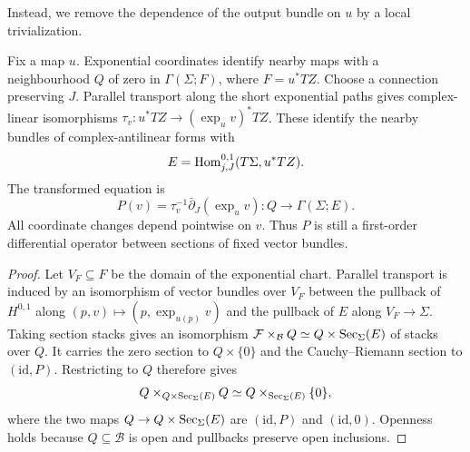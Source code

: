 Instead, we remove the dependence of the output bundle on $u$ by a local
trivialization.

Fix a map $u$. Exponential coordinates identify nearby maps with a
neighbourhood $Q$ of zero in $\Gamma(\Sigma;F)$, where $F=u^*TZ$.
Choose a connection preserving $J$. Parallel transport along the short
exponential paths gives complex-linear isomorphisms
$\tau_v\colon u^*TZ\to(\exp_u v)^*TZ$.
These identify the nearby bundles of complex-antilinear forms with
\[
 E=\operatorname{Hom}^{0,1}_{j,J}(T\Sigma,u^*TZ).
\]
The transformed equation is
\begin{equation}\label{eq:Local_Cauchy_Riemann_Operator_Fourteen}
 P(v)=\tau_v^{-1}\bar\partial_J(\exp_u v)
 \colon Q\longrightarrow\Gamma(\Sigma;E).
\end{equation}
All coordinate changes depend pointwise on $v$. Thus $P$ is still a
first-order differential operator between sections of fixed vector bundles.


\begin{proof}
  Let $V_F\subseteq F$ be the domain of the exponential chart. Parallel
  transport is induced by an isomorphism of vector bundles over $V_F$
  between the pullback of $H^{0,1}$ along
  $(p,v)\mapsto(p,\exp_{u(p)}v)$ and the pullback of $E$ along
  $V_F\to\Sigma$. Taking section stacks gives an isomorphism
  $\mathcal F\times_{\mathcal B}Q\simeq Q\times\operatorname{Sec}_\Sigma(E)$ of stacks
  over $Q$. It carries the zero section to $Q\times\{0\}$ and the
  Cauchy--Riemann section to $(\mathrm{id},P)$. Restricting
   to $Q$ therefore
  gives
  \[
    Q\times_{Q\times\operatorname{Sec}_\Sigma(E)}Q\simeq Q\times_{\operatorname{Sec}_\Sigma(E)}\{0\},
  \]
  where the two maps $Q\to Q\times\operatorname{Sec}_\Sigma(E)$ are $(\mathrm{id},P)$
  and $(\mathrm{id},0)$. Openness holds because $Q\subseteq\mathcal B$
  is open and pullbacks preserve open inclusions.
\end{proof}

